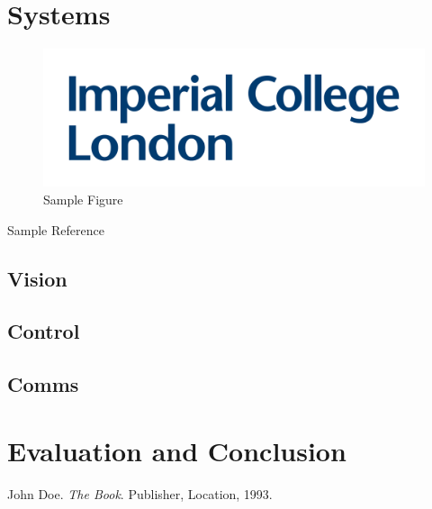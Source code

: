 \documentclass[a4paper, table]{article}
\begin{document}
\section{Systems}

\begin{figure}[H]
\centering
\includegraphics[scale=0.2]{logo.png}
\caption{Sample Figure}
\label{fig:image1}
\end{figure}

Sample Reference\cite{sample}

\subsection{Vision}
\subsection{Control}
\subsection{Comms}

\section{Evaluation and Conclusion}

\newpage

\nocite{*}
\begin{thebibliography}{9}
    John Doe. 
    \textit{The Book}. 
    Publisher, Location, 1993.
\end{thebibliography}
\listoffigures
\end{document}
